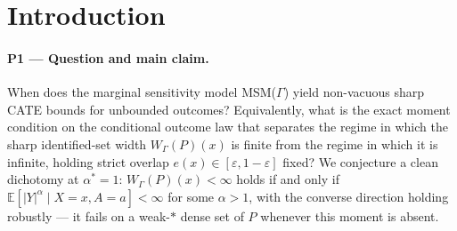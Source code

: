 \documentclass[11pt]{article}
\newcommand{\E}{\mathbb{E}}
\theoremstyle{definition}
\theoremstyle{plain}
\theoremstyle{remark}
\begin{document}
\begin{abstract}
We study sharp partial identification of the conditional average treatment effect (CATE) $\tau(x)$ under the marginal sensitivity model MSM($\Gamma$) with $\Gamma>1$ and strict propensity overlap $e(x)\in[\varepsilon,1-\varepsilon]$, when the outcome law is permitted to be unbounded. The flagship claim is a moment-existence dichotomy: the sharp identified-set width $W_{\Gamma}(P)(x)$ is finite if and only if the conditional outcome law $P_{Y\mid X=x,A=a}$ admits a finite $\alpha$-th absolute moment for some $\alpha>1$. Sufficiency yields a closed-form upper bound $\overline{W}_{\Gamma,\alpha}(x)$ that recovers the bounded-support Manski--MSM($\Gamma$) width in the $\alpha\to\infty$ limit; necessity is the non-trivial half --- if no $\alpha>1$ moment exists, then in every weak-$*$ neighborhood of $P$ (restricted to MSM($\Gamma$) and strict overlap) there exists $P'$ with $W_{\Gamma}(P')(x)=+\infty$. Resolution would supply the first overlap-anchored, alpha-indexed characterization of when MSM($\Gamma$) CATE bounds are non-vacuous, closing the gap between bounded-outcome sharpness results \citep{KallusMaoZhou2019CATEIntervals,YadlowskyNamkoongBasuDuchiTian2022Bounds} and the heavy-tail vacuity warnings raised by \citet{AsiaeePalBeckHuling2026SharpGeneralization}. The flagship statement is a Conjecture; the limit corollary is provable.
\end{abstract}

\section{Introduction}

\paragraph{P1 --- Question and main claim.}
When does the marginal sensitivity model MSM($\Gamma$) yield non-vacuous sharp CATE bounds for unbounded outcomes? Equivalently, what is the exact moment condition on the conditional outcome law that separates the regime in which the sharp identified-set width $W_{\Gamma}(P)(x)$ is finite from the regime in which it is infinite, holding strict overlap $e(x)\in[\varepsilon,1-\varepsilon]$ fixed? We conjecture a clean dichotomy at $\alpha^{*}=1$: $W_{\Gamma}(P)(x)<\infty$ holds if and only if $\E[|Y|^{\alpha}\mid X=x,A=a]<\infty$ for some $\alpha>1$, with the converse direction holding robustly --- it fails on a weak-$*$ dense set of $P$ whenever this moment is absent.
\end{document}
